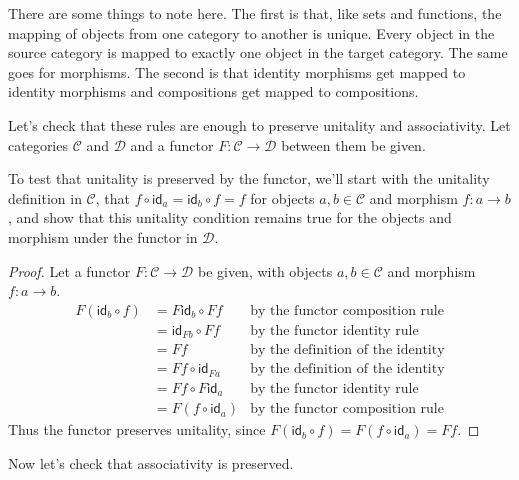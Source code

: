 \documentclass[12pt]{article}
\theoremstyle{definition}
\begin{document}
There are some things to note here.
The first is that, like sets and functions, the mapping of objects from one category to another is unique.
Every object in the source category is mapped to exactly one object in the target category.
The same goes for morphisms.
The second is that identity morphisms get mapped to identity morphisms and compositions get mapped to compositions.

Let's check that these rules are enough to preserve unitality and associativity.
Let categories $\mathcal{C}$ and $\mathcal{D}$ and a functor $F:\mathcal{C} \rightarrow \mathcal{D}$ between them be given.

To test that unitality is preserved by the functor, we'll start with the unitality definition in $\mathcal{C}$, that $f\circ \mathsf{id}_a=\mathsf{id}_b\circ f=f$ for objects $a,b\in\mathcal{C}$ and morphism $f:a \rightarrow b$, and show that this unitality condition remains true for the objects and morphism under the functor in $\mathcal{D}$.
\begin{proof}
    Let a functor $F:\mathcal{C} \rightarrow \mathcal{D}$ be given, with objects $a,b\in\mathcal{C}$ and morphism $f:a \rightarrow b$.
    \begin{align*}
        F(\mathsf{id}_b \circ f) & = F\mathsf{id}_b \circ Ff   & \text{by the functor composition rule}   \\
                                 & = \mathsf{id}_{Fb} \circ Ff & \text{by the functor identity rule}      \\
                                 & = Ff                        & \text{by the definition of the identity} \\
                                 & = Ff \circ \mathsf{id}_{Fa} & \text{by the definition of the identity} \\
                                 & = Ff \circ F\mathsf{id}_a   & \text{by the functor identity rule}      \\
                                 & = F(f \circ \mathsf{id}_a)  & \text{by the functor composition rule}
    \end{align*}
    Thus the functor preserves unitality, since $F(\mathsf{id}_b \circ f) = F(f \circ \mathsf{id}_a) = Ff$.
\end{proof}
Now let's check that associativity is preserved.
\end{document}
